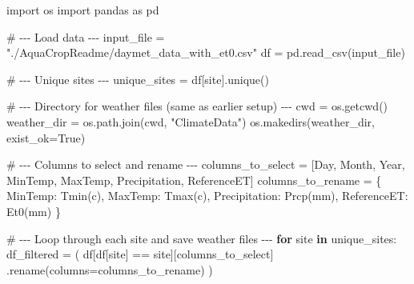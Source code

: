 \documentclass[
  letterpaper,
  DIV=11,
  numbers=noendperiod]{scrartcl}
\newenvironment{Shaded}{\begin{snugshade}}{\end{snugshade}}
\newcommand{\CommentTok}[1]{\textcolor[rgb]{0.37,0.37,0.37}{#1}}
\newcommand{\ControlFlowTok}[1]{\textcolor[rgb]{0.00,0.23,0.31}{\textbf{#1}}}
\newcommand{\ImportTok}[1]{\textcolor[rgb]{0.00,0.46,0.62}{#1}}
\newcommand{\KeywordTok}[1]{\textcolor[rgb]{0.00,0.23,0.31}{\textbf{#1}}}
\newcommand{\NormalTok}[1]{\textcolor[rgb]{0.00,0.23,0.31}{#1}}
\newcommand{\OperatorTok}[1]{\textcolor[rgb]{0.37,0.37,0.37}{#1}}
\newcommand{\StringTok}[1]{\textcolor[rgb]{0.13,0.47,0.30}{#1}}
\newcommand{\VariableTok}[1]{\textcolor[rgb]{0.07,0.07,0.07}{#1}}
\begin{document}
\begin{Shaded}
\begin{Highlighting}[]
\ImportTok{import}\NormalTok{ os}
\ImportTok{import}\NormalTok{ pandas }\ImportTok{as}\NormalTok{ pd}

\CommentTok{\# {-}{-}{-} Load data {-}{-}{-}}
\NormalTok{input\_file }\OperatorTok{=} \StringTok{"./AquaCropReadme/daymet\_data\_with\_et0.csv"}
\NormalTok{df }\OperatorTok{=}\NormalTok{ pd.read\_csv(input\_file)}

\CommentTok{\# {-}{-}{-} Unique sites {-}{-}{-}}
\NormalTok{unique\_sites }\OperatorTok{=}\NormalTok{ df[}\StringTok{\textquotesingle{}site\textquotesingle{}}\NormalTok{].unique()}

\CommentTok{\# {-}{-}{-} Directory for weather files (same as earlier setup) {-}{-}{-}}
\NormalTok{cwd }\OperatorTok{=}\NormalTok{ os.getcwd()}
\NormalTok{weather\_dir }\OperatorTok{=}\NormalTok{ os.path.join(cwd, }\StringTok{"ClimateData"}\NormalTok{)}
\NormalTok{os.makedirs(weather\_dir, exist\_ok}\OperatorTok{=}\VariableTok{True}\NormalTok{)}

\CommentTok{\# {-}{-}{-} Columns to select and rename {-}{-}{-}}
\NormalTok{columns\_to\_select }\OperatorTok{=}\NormalTok{ [}\StringTok{\textquotesingle{}Day\textquotesingle{}}\NormalTok{, }\StringTok{\textquotesingle{}Month\textquotesingle{}}\NormalTok{, }\StringTok{\textquotesingle{}Year\textquotesingle{}}\NormalTok{, }\StringTok{\textquotesingle{}MinTemp\textquotesingle{}}\NormalTok{, }\StringTok{\textquotesingle{}MaxTemp\textquotesingle{}}\NormalTok{, }\StringTok{\textquotesingle{}Precipitation\textquotesingle{}}\NormalTok{, }\StringTok{\textquotesingle{}ReferenceET\textquotesingle{}}\NormalTok{]}
\NormalTok{columns\_to\_rename }\OperatorTok{=}\NormalTok{ \{}
    \StringTok{\textquotesingle{}MinTemp\textquotesingle{}}\NormalTok{: }\StringTok{\textquotesingle{}Tmin(c)\textquotesingle{}}\NormalTok{,}
    \StringTok{\textquotesingle{}MaxTemp\textquotesingle{}}\NormalTok{: }\StringTok{\textquotesingle{}Tmax(c)\textquotesingle{}}\NormalTok{,}
    \StringTok{\textquotesingle{}Precipitation\textquotesingle{}}\NormalTok{: }\StringTok{\textquotesingle{}Prcp(mm)\textquotesingle{}}\NormalTok{,}
    \StringTok{\textquotesingle{}ReferenceET\textquotesingle{}}\NormalTok{: }\StringTok{\textquotesingle{}Et0(mm)\textquotesingle{}}
\NormalTok{\}}

\CommentTok{\# {-}{-}{-} Loop through each site and save weather files {-}{-}{-}}
\ControlFlowTok{for}\NormalTok{ site }\KeywordTok{in}\NormalTok{ unique\_sites:}
\NormalTok{    df\_filtered }\OperatorTok{=}\NormalTok{ (}
\NormalTok{        df[df[}\StringTok{\textquotesingle{}site\textquotesingle{}}\NormalTok{] }\OperatorTok{==}\NormalTok{ site][columns\_to\_select]}
\NormalTok{        .rename(columns}\OperatorTok{=}\NormalTok{columns\_to\_rename)}
\NormalTok{    )}
    

\end{Highlighting}
\end{Shaded}
\end{document}
